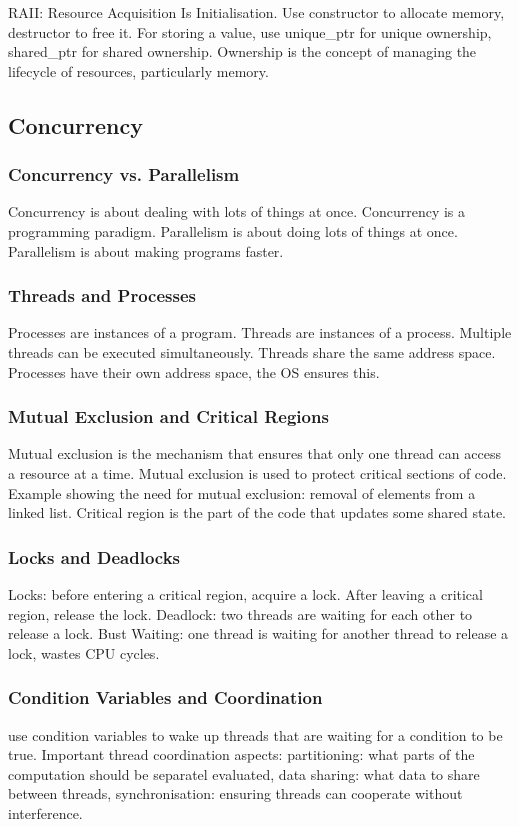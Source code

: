 \documentclass{article}
\begin{document}
RAII: Resource Acquisition Is Initialisation.
Use constructor to allocate memory, destructor to free it.
For storing a value, use unique\_ptr for unique ownership, shared\_ptr for shared ownership.
Ownership is the concept of managing the lifecycle of resources, particularly memory.

\subsection*{Concurrency}

\subsubsection*{Concurrency vs. Parallelism}
Concurrency is about dealing with lots of things at once.
Concurrency is a programming paradigm.
Parallelism is about doing lots of things at once.
Parallelism is about making programs faster.

\subsubsection*{Threads and Processes}
Processes are instances of a program.
Threads are instances of a process.
Multiple threads can be executed simultaneously.
Threads share the same address space.
Processes have their own address space, the OS ensures this.

\subsubsection*{Mutual Exclusion and Critical Regions}
Mutual exclusion is the mechanism that ensures that only one thread can access a resource at a time.
Mutual exclusion is used to protect critical sections of code.
Example showing the need for mutual exclusion: removal of elements from a linked list.
Critical region is the part of the code that updates some shared state.

\subsubsection*{Locks and Deadlocks}
Locks: before entering a critical region, acquire a lock.
After leaving a critical region, release the lock.
Deadlock: two threads are waiting for each other to release a lock.
Bust Waiting: one thread is waiting for another thread to release a lock, wastes CPU cycles.

\subsubsection*{Condition Variables and Coordination}
use condition variables to wake up threads that are waiting for a condition to be true.
Important thread coordination aspects: 
partitioning: what parts of the computation should be separatel evaluated,
data sharing: what data to share between threads,
synchronisation: ensuring threads can cooperate without interference.
\end{document}
